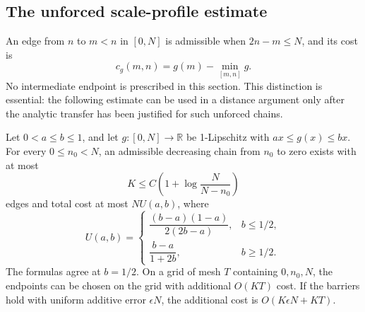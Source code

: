 \subsection{The unforced scale-profile estimate}
\label{unforced:profile-section}

An edge from \(n\) to \(m<n\) in \([0,N]\) is admissible when
\(2n-m\le N\), and its cost is
$$
 c_g(m,n)=g(m)-\min_{[m,n]}g.
$$
No intermediate endpoint is prescribed in this section. This distinction is
essential: the following estimate can be used in a distance argument only after
the analytic transfer has been justified for such unforced chains.

\begin{lemma}\label{unforced:profile}
Let \(0<a\le b\le1\), and let \(g:[0,N]\to\mathbb R\) be 1-Lipschitz
with \(ax\le g(x)\le bx\). For every \(0\le n_0<N\), an admissible
decreasing chain from \(n_0\) to zero exists with at most
$$
 K\le C\left(1+\log\frac{N}{N-n_0}\right)
$$
edges and total cost at most \(NU(a,b)\), where
\begin{equation}\label{unforced:cost}
 U(a,b)=\begin{cases}
 \dfrac{(b-a)(1-a)}{2(2b-a)},&b\le1/2,\\[7pt]
 \dfrac{b-a}{1+2b},&b\ge1/2.
 \end{cases}
\end{equation}
The formulas agree at \(b=1/2\). On a grid of mesh \(T\) containing
\(0,n_0,N\), the endpoints can be chosen on the grid with additional
\(O(KT)\) cost. If the barriers hold with uniform additive error
\(\epsilon N\), the additional cost is \(O(K\epsilon N+KT)\).
\end{lemma}

